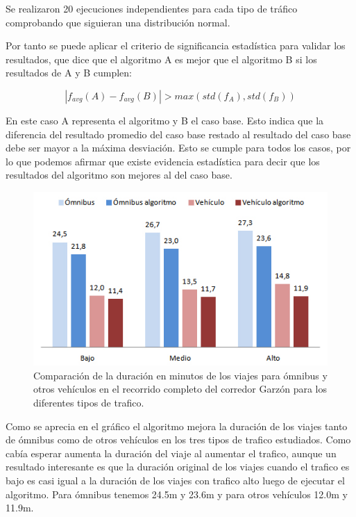 Se realizaron 20 ejecuciones independientes para cada tipo de tráfico comprobando que siguieran una distribución normal.

Por tanto se puede aplicar el criterio de significancia estadística para validar los resultados, que dice que el
algoritmo A es mejor que el algoritmo B si los resultados de A y B cumplen:



\begin{equation}
\label{eq:funcion_significancia}
\left |f_{avg}(A) - f_{avg}(B)  \right | > max(std(f_A),std(f_B))
\end{equation}

En este caso A representa el algoritmo y B el caso base. Esto indica que la diferencia del resultado promedio del caso base restado al resultado del caso base debe ser mayor a la máxima desviación.
Esto se cumple para todos los casos, por lo que podemos afirmar que existe evidencia estadística para decir que los resultados del algoritmo son mejores al del caso base.

\begin{figure}[h]
	\centering
	\includegraphics[width=0.7\linewidth]{Figures/duracion_viajes}
	\caption{Comparación de la duración en minutos de los viajes para ómnibus y otros vehículos en el recorrido completo del corredor Garzón para los diferentes tipos de trafico.}
	\label{fig:duracion_viajes}
\end{figure}

Como se aprecia en el gráfico el algoritmo mejora la duración de los viajes tanto de ómnibus como de otros vehículos en los tres tipos de trafico estudiados. Como cabía esperar aumenta la duración del viaje al aumentar el trafico, aunque un resultado interesante es que la duración original de los viajes cuando el trafico es bajo es casi igual a la duración de los viajes con trafico alto luego de ejecutar el algoritmo.
Para ómnibus tenemos 24.5m y 23.6m y  para otros vehículos 12.0m y 11.9m. 



